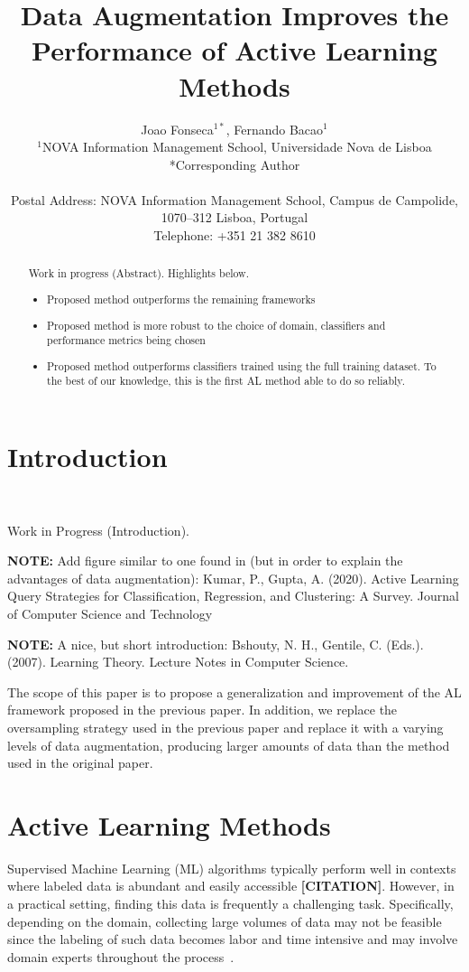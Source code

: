 \documentclass[parskip=full]{scrartcl}
\date{}
\title{%
    Data Augmentation Improves the Performance of Active Learning Methods
}
\author{%
	Joao Fonseca\(^{1*}\), Fernando Bacao\(^{1}\)
	\\
	\small{\(^{1}\)NOVA Information Management School, Universidade Nova de Lisboa}
	\\
	\small{*Corresponding Author}
	\\
	\\
	\small{Postal Address: NOVA Information Management School, Campus de
    Campolide, 1070--312 Lisboa, Portugal}
	\\
	\small{Telephone: +351 21 382 8610}
}
\begin{document}
\maketitle

\begin{abstract}
    Work in progress (Abstract). Highlights below.
    \begin{itemize}
        \item Proposed method outperforms the remaining frameworks
        \item Proposed method is more robust to the choice of domain, classifiers
            and performance metrics being chosen
        \item Proposed method outperforms classifiers trained using the full
            training dataset. To the best of our knowledge, this is the first
            AL method able to do so reliably.
    \end{itemize}
\end{abstract}

\section{Introduction}~\label{sec:introduction}

Work in Progress (Introduction).

\textbf{NOTE:} Add figure similar to one found in (but in order to explain the
advantages of data augmentation): Kumar, P., Gupta, A. (2020). Active Learning
Query Strategies for Classification, Regression, and Clustering: A Survey.
Journal of Computer Science and Technology

\textbf{NOTE:} A nice, but short introduction: Bshouty, N. H., Gentile, C.
(Eds.). (2007). Learning Theory. Lecture Notes in Computer Science\@.

The scope of this paper is to propose a generalization and
improvement of the AL framework proposed in the previous paper. In addition,
we replace the oversampling strategy used in the previous paper and replace it
with a varying levels of data augmentation, producing larger amounts of data
than the method used in the original paper.

\section{Active Learning Methods}

Supervised Machine Learning (ML) algorithms typically perform well in contexts
where labeled data is abundant and easily accessible \textbf{[CITATION]}.
However, in a practical setting, finding this data is frequently a challenging
task. Specifically, depending on the domain, collecting large volumes of data
may not be feasible since the labeling of such data becomes labor and time
intensive and may involve domain experts throughout the
process~\cite{Cao2020}.
\end{document}
